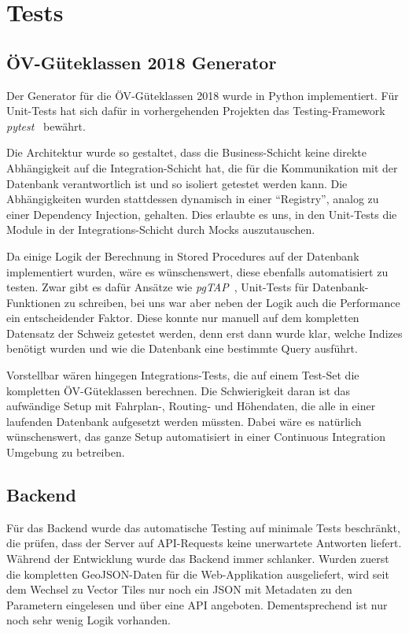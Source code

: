 \section{Tests}
\label{Tests}

\subsection{ÖV-Güteklassen 2018 Generator}
\label{Tests:ÖV-Güteklassen 2018 Generator}

Der Generator für die \acs{ÖV}-Güteklassen 2018 wurde in Python implementiert.
Für Unit-Tests hat sich dafür in vorhergehenden Projekten das Testing-Framework \emph{pytest}~\cite{pytest} bewährt.

Die Architektur wurde so gestaltet, dass die Business-Schicht keine direkte Abhängigkeit auf die Integration-Schicht hat, die für die Kommunikation mit der Datenbank verantwortlich ist und so isoliert getestet werden kann.
Die Abhängigkeiten wurden stattdessen dynamisch in einer "`Registry"', analog zu einer Dependency Injection, gehalten.
Dies erlaubte es uns, in den Unit-Tests die Module in der Integrations-Schicht durch Mocks auszutauschen.

Da einige Logik der Berechnung in Stored Procedures auf der Datenbank implementiert wurden, wäre es wünschenswert, diese ebenfalls automatisiert zu testen.
Zwar gibt es dafür Ansätze wie \emph{pgTAP}~\cite{pgTAP}, Unit-Tests für Datenbank-Funktionen zu schreiben, bei uns war aber neben der Logik auch die Performance ein entscheidender Faktor.
Diese konnte nur manuell auf dem kompletten Datensatz der Schweiz getestet werden, denn erst dann wurde klar, welche Indizes benötigt wurden und wie die Datenbank eine bestimmte Query ausführt.

Vorstellbar wären hingegen Integrations-Tests, die auf einem Test-Set die kompletten \acs{ÖV}-Güteklassen berechnen.
Die Schwierigkeit daran ist das aufwändige Setup mit Fahrplan-, Routing- und Höhendaten, die alle in einer laufenden Datenbank aufgesetzt werden müssten.
Dabei wäre es natürlich wünschenswert, das ganze Setup automatisiert in einer Continuous Integration Umgebung zu betreiben.

\subsection{Backend}
\label{Tests:Backend}

Für das Backend wurde das automatische Testing auf minimale Tests beschränkt, die prüfen, dass der Server auf API-Requests keine unerwartete Antworten liefert.
Während der Entwicklung wurde das Backend immer schlanker.
Wurden zuerst die kompletten GeoJSON-Daten für die Web-Applikation ausgeliefert, wird seit dem Wechsel zu Vector Tiles nur noch ein JSON mit Metadaten zu den Parametern eingelesen und über eine API angeboten.
Dementsprechend ist nur noch sehr wenig Logik vorhanden.

